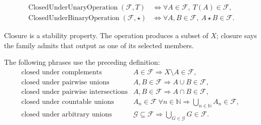 \begin{remark*}
\[
\begin{aligned}
\operatorname{ClosedUnderUnaryOperation}(\mathcal F,T)
&\iff \forall A\in\mathcal F,\ T(A)\in\mathcal F,\\
\operatorname{ClosedUnderBinaryOperation}(\mathcal F,\star)
&\iff \forall A,B\in\mathcal F,\ A\star B\in\mathcal F.
\end{aligned}
\]
\end{remark*}

\begin{remark*}[Interpretation]
Closure is a stability property.  The operation produces a subset of \(X\);
closure says the family admits that output as one of its selected members.
\end{remark*}

\begin{remark*}[Exposition]
The following phrases use the preceding definition:
\[
\begin{array}{ll}
\text{closed under complements}
  & A\in\mathcal F\Rightarrow X\setminus A\in\mathcal F,\\
\text{closed under pairwise unions}
  & A,B\in\mathcal F\Rightarrow A\cup B\in\mathcal F,\\
\text{closed under pairwise intersections}
  & A,B\in\mathcal F\Rightarrow A\cap B\in\mathcal F,\\
\text{closed under countable unions}
  & A_n\in\mathcal F\ \forall n\in\mathbb N
    \Rightarrow \bigcup_{n\in\mathbb N}A_n\in\mathcal F,\\
\text{closed under arbitrary unions}
  & \mathcal G\subseteq\mathcal F
    \Rightarrow \bigcup_{G\in\mathcal G}G\in\mathcal F.
\end{array}
\]
\end{remark*}

